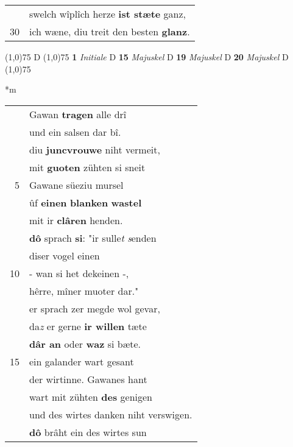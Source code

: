 \documentclass[8pt,a4paper,notitlepage]{article}
\begin{document}
\begin{table}[ht]
\begin{minipage}[t]{0.5\linewidth}
\begin{tabular}{rl}
 & swelch wîplîch herze \textbf{ist stæte} ganz,\\ 
30 & ich wæne, diu treit den besten \textbf{glanz}.\\ 
\end{tabular}
\scriptsize
\line(1,0){75} \newline
D \newline
\line(1,0){75} \newline
\textbf{1} \textit{Initiale} D  \textbf{15} \textit{Majuskel} D  \textbf{19} \textit{Majuskel} D  \textbf{20} \textit{Majuskel} D  \newline
\line(1,0){75} \newline
\newline
\end{minipage}
\hspace{0.5cm}
\begin{minipage}[t]{0.5\linewidth}
\small
\begin{center}*m
\end{center}
\begin{tabular}{rl}
 & Gawan \textbf{tragen} alle drî\\ 
 & und ein salsen dar bî.\\ 
 & diu \textbf{juncvrouwe} niht vermeit,\\ 
 & mit \textbf{guoten} zühten si sneit\\ 
5 & Gawane süeziu mursel\\ 
 & ûf \textbf{einen} \textbf{blanken} \textbf{wastel}\\ 
 & mit ir \textbf{clâren} henden.\\ 
 & \textbf{dô} sprach \textbf{si}: "ir sulle\textit{t} \textit{s}enden\\ 
 & diser vogel einen\\ 
10 & - wan si het dekeinen -,\\ 
 & hêrre, mîner muoter dar."\\ 
 & er sprach zer megde wol gevar,\\ 
 & da\textit{z} er gerne \textbf{ir willen} tæte\\ 
 & \textbf{dâr an} oder \textbf{waz} si bæte.\\ 
15 & ein galander wart gesant\\ 
 & der wirtinne. Gawanes hant\\ 
 & wart mit zühten \textbf{des} genigen\\ 
 & und des wirtes danken niht verswigen.\\ 
 & \textbf{dô} brâht ein des wirtes sun\\ 

\end{tabular}
\end{minipage}
\end{table}
\end{document}
